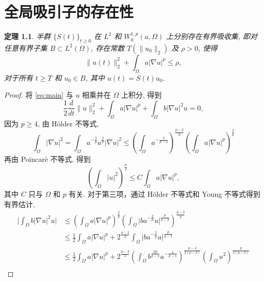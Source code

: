 \documentclass[twoside,longtitle]{LZUthesis}
\newtheorem{theorem}{定理}[chapter]
\theoremstyle{definition}
\numberwithin{equation}{chapter}
\newcommand*\abs[1]{\lvert#1\rvert}
\newcommand*\norm[1]{\lVert#1\rVert}
\newcommand*\Brace[1]{\lbrace#1\rbrace}
\begin{document}
\chapter{全局吸引子的存在性}\label{ch:existence_of_the_global_attractors}
\begin{theorem}
	半群 $\Brace{S(t)}_{t \geq 0} $ 在
	$L^2$ 和 $W_0^{1,p}(a,\Omega)$ 上分别存在有界吸收集, 即对任意有界子集
	$B \subset L^2(\Omega)$, 存在常数 $T(\norm{u_0}_2)$ 及 $\rho > 0$, 使得
	\begin{equation}
		\norm{u(t)}_2^2 + \int_{\Omega}a\abs{\nabla u}^p \leq \rho,
	\end{equation}
	对于所有 $t \geq T$ 和 $u_0 \in B$, 其中 $u(t) = S(t)u_0$.
\end{theorem}
\begin{proof}
	将 \cref{eq:main} 与 $u$ 相乘并在 $\Omega$ 上积分,
	得到
	\begin{equation}\label{eq:operate_u}
		\frac{1}{2}\frac{d}{dt}\norm{u}_2^2
		+ \int_\Omega a\abs{\nabla u}^p
		+ \int_\Omega b\abs{\nabla u}^2u = 0,
	\end{equation}
	因为 $p \geq 4$, 由 H\"older 不等式,
	\begin{equation}
			\int_{\Omega}\abs{\nabla u}^2
			= \int_{\Omega}a^{-\frac{2}{p}}a^{\frac{2}{p}}\abs{\nabla u}^2
			\leq \left(\int_{\Omega}a^{-\frac{2}{p-2}}\right)^{\frac{p-2}{p}}
			\left(\int_{\Omega}a\abs{\nabla u}^p\right)^{\frac{2}{p}}
	\end{equation}
	再由 Poincar\`e 不等式, 得到
	\begin{equation}
		\left(\int_{\Omega}\abs{u}^2\right)^{\frac{p}{2}}
		\leq C\int_{\Omega}a\abs{\nabla u}^p,
	\end{equation}
	其中 $C$ 只与 $\Omega$ 和 $p$ 有关. 对于第三项，通过
	H\"older 不等式和 Young 不等式得到有界估计,
	\begin{equation}\label{eq:absorb_damping_u}
		\begin{split}
			\abs{\int_{\Omega}b\abs{\nabla u}^2 u}
			&\leq \left(\int_{\Omega}a\abs{\nabla u}^p\right)^{\frac{2}{p}}
			\left(\int_{\Omega}\abs{b a^{-\frac{2}{p}} u}^{\frac{p}{p-2}}\right)^{\frac{p-2}{p}}\\
			&\leq \frac{1}{2}\int_{\Omega}a\abs{\nabla u}^p
			+ 2^{\frac{p-2}{2}}\int_{\Omega}\abs{b a^{-\frac{2}{p}} u}^{\frac{p}{p-2}}\\
			&\leq \frac{1}{2}\int_{\Omega}a\abs{\nabla u}^p
			+ 2^{\frac{p-2}{2}}\left(\int_{\Omega}b^{\frac{2p}{p-4}}a^{-\frac{4}{p-4}}\right)^{\frac{p-4}{2(p-2)}}
			\left(\int_{\Omega}u^2\right)^{\frac{p}{2(p-2)}}\\

\end{split}
\end{equation}
\end{proof}
\end{document}
